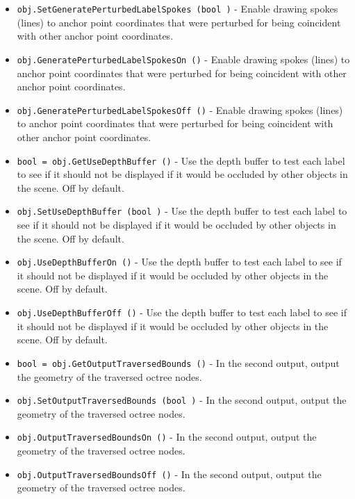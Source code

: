 \begin{itemize}
\item  \verb|obj.SetGeneratePerturbedLabelSpokes (bool )| -  Enable drawing spokes (lines) to anchor point coordinates that were perturbed
 for being coincident with other anchor point coordinates.

\item  \verb|obj.GeneratePerturbedLabelSpokesOn ()| -  Enable drawing spokes (lines) to anchor point coordinates that were perturbed
 for being coincident with other anchor point coordinates.

\item  \verb|obj.GeneratePerturbedLabelSpokesOff ()| -  Enable drawing spokes (lines) to anchor point coordinates that were perturbed
 for being coincident with other anchor point coordinates.

\item  \verb|bool = obj.GetUseDepthBuffer ()| -  Use the depth buffer to test each label to see if it should not be displayed if
 it would be occluded by other objects in the scene. Off by default.

\item  \verb|obj.SetUseDepthBuffer (bool )| -  Use the depth buffer to test each label to see if it should not be displayed if
 it would be occluded by other objects in the scene. Off by default.

\item  \verb|obj.UseDepthBufferOn ()| -  Use the depth buffer to test each label to see if it should not be displayed if
 it would be occluded by other objects in the scene. Off by default.

\item  \verb|obj.UseDepthBufferOff ()| -  Use the depth buffer to test each label to see if it should not be displayed if
 it would be occluded by other objects in the scene. Off by default.

\item  \verb|bool = obj.GetOutputTraversedBounds ()| -  In the second output, output the geometry of the traversed octree nodes.

\item  \verb|obj.SetOutputTraversedBounds (bool )| -  In the second output, output the geometry of the traversed octree nodes.

\item  \verb|obj.OutputTraversedBoundsOn ()| -  In the second output, output the geometry of the traversed octree nodes.

\item  \verb|obj.OutputTraversedBoundsOff ()| -  In the second output, output the geometry of the traversed octree nodes.


\end{itemize}
